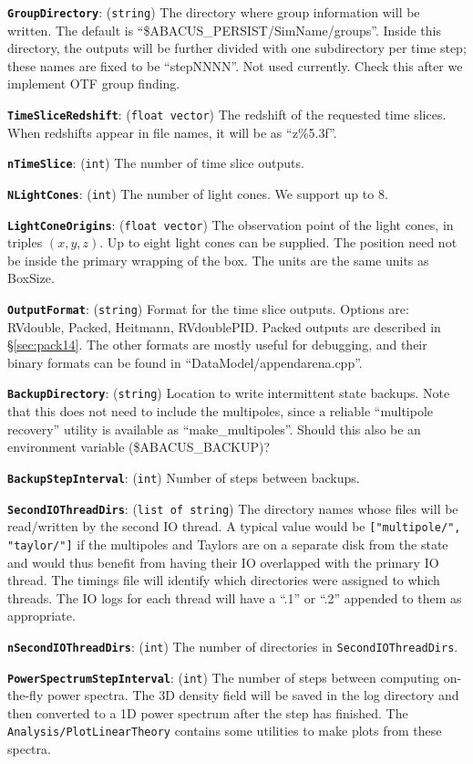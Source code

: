 \documentclass[11pt,preprint]{aastex}
\newcommand{\param}[2]{\medskip\noindent\textbf{\texttt{#1}}: ({\tt #2}) }
\newcommand{\todo}{}
\newcommand{\todo}[1]{{\bf TODO: #1}}
\begin{document}
\param{GroupDirectory}{string} The directory where group information
will be written.  The default is ``\$ABACUS\_PERSIST/SimName/groups''.  Inside this directory,
the outputs will be further divided with one subdirectory per time
step; these names are fixed to be ``stepNNNN''.
\todo{Not used currently.  Check this after we implement OTF group finding.}


\param{TimeSliceRedshift}{float vector} The redshift of the requested 
time slices.  When redshifts appear in file names, it will be as ``z\%5.3f''.

\param{nTimeSlice}{int} The number of time slice outputs.

\param{NLightCones}{int} The number of light cones.  We support up to 8.

\param{LightConeOrigins}{float vector} The observation point
of the light cones, in triples $(x,y,z)$.  Up to eight light cones 
can be supplied.  The position need not be inside the primary 
wrapping of the box.  The units are the same units as BoxSize.

\param{OutputFormat}{string} Format for the time slice outputs.
Options are: RVdouble, Packed, Heitmann, RVdoublePID.  Packed outputs are described in \S\ref{sec:pack14}.  The other formats are mostly useful for debugging, and their binary formats can be found in ``DataModel/appendarena.cpp''.

\param{BackupDirectory}{string} Location to write intermittent state backups.  Note that this does not need to include the multipoles, since a reliable ``multipole recovery'' utility is available as ``make\_multipoles''.
\todo{Should this also be an environment variable (\$ABACUS\_BACKUP)?}

\param{BackupStepInterval}{int} Number of steps between backups.

\param{SecondIOThreadDirs}{list of string} The directory names whose files will be read/written by the second IO thread.  A typical value would be \verb|["multipole/", "taylor/"]| if the multipoles and Taylors are on a separate disk from the state and would thus benefit from having their IO overlapped with the primary IO thread.  The timings file will identify which directories were assigned to which threads.  The IO logs for each thread will have a ``.1'' or ``.2'' appended to them as appropriate.

\param{nSecondIOThreadDirs}{int} The number of directories in \verb|SecondIOThreadDirs|.

\param{PowerSpectrumStepInterval}{int} The number of steps between computing on-the-fly power spectra.  The 3D density field will be saved in the log directory and then converted to a 1D power spectrum after the step has finished.  The \verb|Analysis/PlotLinearTheory| contains some utilities to make plots from these spectra.
\end{document}
